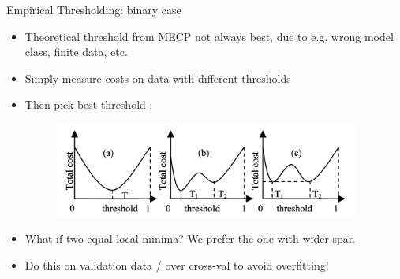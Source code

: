 \documentclass[11pt,compress,t,notes=noshow, xcolor=table]{beamer}
\begin{document}

\begin{frame}{Empirical Thresholding: binary case}
    \begin{itemize}
        \item Theoretical threshold from MECP not always best, due to e.g. wrong model class, finite data, etc.
        \item Simply measure costs on data with different thresholds
        \item Then pick best threshold :
        \begin{figure}[h]
            \centering
            \includegraphics[width=0.95\textwidth]{figure/threshold_adjusting.png}
        \end{figure}


        \item What if two equal local minima? We prefer the one with wider span %

        \item Do this on validation data / over cross-val to avoid overfitting!
    \end{itemize}
\end{frame}
\end{document}
